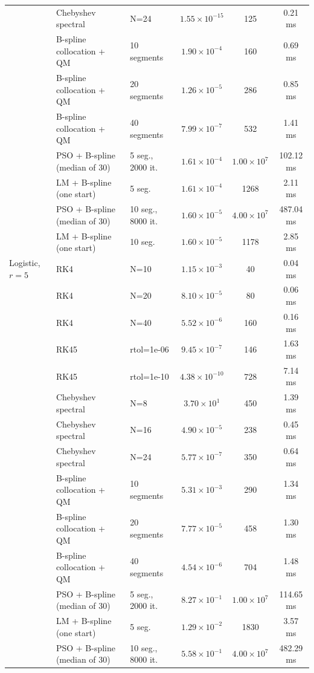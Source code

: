 \begin{tabular}{lllccc}
 & Chebyshev spectral & N=24 & $1.55\times10^{-15}$ & 125 & 0.21 ms\\
 & B-spline collocation + QM & 10 segments & $1.90\times10^{-4}$ & 160 & 0.69 ms\\
 & B-spline collocation + QM & 20 segments & $1.26\times10^{-5}$ & 286 & 0.85 ms\\
 & B-spline collocation + QM & 40 segments & $7.99\times10^{-7}$ & 532 & 1.41 ms\\
 & PSO + B-spline (median of 30) & 5 seg., 2000 it. & $1.61\times10^{-4}$ & $1.00\times10^{7}$ & 102.12 ms\\
 & LM + B-spline (one start) & 5 seg. & $1.61\times10^{-4}$ & 1268 & 2.11 ms\\
 & PSO + B-spline (median of 30) & 10 seg., 8000 it. & $1.60\times10^{-5}$ & $4.00\times10^{7}$ & 487.04 ms\\
 & LM + B-spline (one start) & 10 seg. & $1.60\times10^{-5}$ & 1178 & 2.85 ms\\
\addlinespace
Logistic, $r=5$ & RK4 & N=10 & $1.15\times10^{-3}$ & 40 & 0.04 ms\\
 & RK4 & N=20 & $8.10\times10^{-5}$ & 80 & 0.06 ms\\
 & RK4 & N=40 & $5.52\times10^{-6}$ & 160 & 0.16 ms\\
 & RK45 & rtol=1e-06 & $9.45\times10^{-7}$ & 146 & 1.63 ms\\
 & RK45 & rtol=1e-10 & $4.38\times10^{-10}$ & 728 & 7.14 ms\\
 & Chebyshev spectral & N=8 & $3.70\times10^{1}$ & 450 & 1.39 ms\\
 & Chebyshev spectral & N=16 & $4.90\times10^{-5}$ & 238 & 0.45 ms\\
 & Chebyshev spectral & N=24 & $5.77\times10^{-7}$ & 350 & 0.64 ms\\
 & B-spline collocation + QM & 10 segments & $5.31\times10^{-3}$ & 290 & 1.34 ms\\
 & B-spline collocation + QM & 20 segments & $7.77\times10^{-5}$ & 458 & 1.30 ms\\
 & B-spline collocation + QM & 40 segments & $4.54\times10^{-6}$ & 704 & 1.48 ms\\
 & PSO + B-spline (median of 30) & 5 seg., 2000 it. & $8.27\times10^{-1}$ & $1.00\times10^{7}$ & 114.65 ms\\
 & LM + B-spline (one start) & 5 seg. & $1.29\times10^{-2}$ & 1830 & 3.57 ms\\
 & PSO + B-spline (median of 30) & 10 seg., 8000 it. & $5.58\times10^{-1}$ & $4.00\times10^{7}$ & 482.29 ms\\

\end{tabular}
